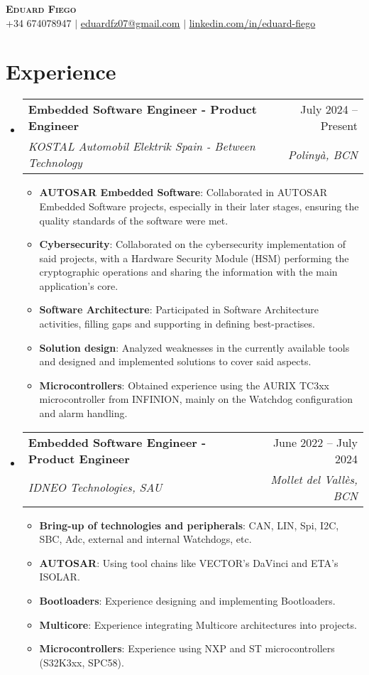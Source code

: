\documentclass[letterpaper,11pt]{article}
\makeatletter
\newcommand{\resumeItem}[2]{
  \item\small{
    \textbf{#1}{: #2 \vspace{-2pt}}
}}
\newcommand{\resumeSubheading}[4]{
  \vspace{-2pt}\item
    \begin{tabular*}{0.97\textwidth}[t]{l@{\extracolsep{\fill}}r}
      \textbf{#1} & #2 \\
      \textit{\small#3} & \textit{\small #4} \\
    \end{tabular*}\vspace{-7pt}
}
\newcommand{\resumeSubHeadingListStart}{\begin{itemize}[leftmargin=0.15in, label={}]}
\newcommand{\resumeSubHeadingListEnd}{\end{itemize}}
\newcommand{\resumeItemListStart}{\begin{itemize}}
\newcommand{\resumeItemListEnd}{\end{itemize}\vspace{-5pt}}
\makeatother
\begin{document}

\begin{center}
    \textbf{\Huge \scshape Eduard Fiego} \\ \vspace{1pt}
    \small +34 674078947 $|$ \href{mailto:eduardfz07@gmail.com}{\underline{eduardfz07@gmail.com}} $|$
    \href{https://www.linkedin.com/in/eduard-fiego-737667237/}{\underline{linkedin.com/in/eduard-fiego}}
\end{center}

\section{Experience}
  \resumeSubHeadingListStart

    \resumeSubheading
      {Embedded Software Engineer - Product Engineer}{July 2024 -- Present}
      {KOSTAL Automobil Elektrik Spain - Between Technology}{Polinyà, BCN}
      \resumeItemListStart
        \resumeItem{AUTOSAR Embedded Software}
        {Collaborated in AUTOSAR Embedded Software projects, especially in their later stages, ensuring the quality standards of the software were met.}
        \resumeItem{Cybersecurity}
        {Collaborated on the cybersecurity implementation of said projects, with a Hardware Security Module (HSM) performing the cryptographic operations and sharing the information with the main application's core.}
        \resumeItem{Software Architecture}
        {Participated in Software Architecture activities, filling gaps and supporting in defining best-practises.}
        \resumeItem{Solution design}
        {Analyzed weaknesses in the currently available tools and designed and implemented solutions to cover said aspects.}
        \resumeItem{Microcontrollers}
        {Obtained experience using the AURIX TC3xx microcontroller from INFINION, mainly on the Watchdog configuration and alarm handling.}
      \resumeItemListEnd

    \resumeSubheading
      {Embedded Software Engineer - Product Engineer}{June 2022 -- July 2024}
      {IDNEO Technologies, SAU}{Mollet del Vallès, BCN}
      \resumeItemListStart
        \resumeItem{Bring-up of technologies and peripherals}
        {CAN, LIN, Spi, I2C, SBC, Adc, external and internal Watchdogs, etc.}
        \resumeItem{AUTOSAR}{
        Using tool chains like VECTOR's DaVinci and ETA's ISOLAR.}
        \resumeItem{Bootloaders}{
        Experience designing and implementing Bootloaders.}
        \resumeItem{Multicore}{
        Experience integrating Multicore architectures into projects.}
        \resumeItem{Microcontrollers}{
        Experience using NXP and ST microcontrollers (S32K3xx, SPC58).}
      \resumeItemListEnd
  \resumeSubHeadingListEnd
\end{document}
